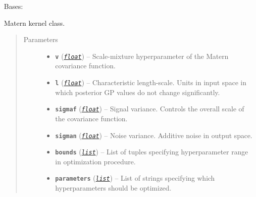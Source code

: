 \documentclass[letterpaper,10pt,english]{sphinxmanual}
\begin{document}
\begin{fulllineitems}
\label{pyGPGO.covfunc:pyGPGO.covfunc.matern}
Bases: \href{https://docs.python.org/2/library/functions.html\#object}{}

Matern kernel class.
\begin{quote}\begin{description}
\item[{Parameters}] \leavevmode\begin{itemize}
\item {} 
\textbf{\texttt{v}} (\href{https://docs.python.org/2/library/functions.html\#float}{\emph{\texttt{float}}}) -- Scale-mixture hyperparameter of the Matern covariance function.

\item {} 
\textbf{\texttt{l}} (\href{https://docs.python.org/2/library/functions.html\#float}{\emph{\texttt{float}}}) -- Characteristic length-scale. Units in input space in which posterior GP values do not
change significantly.

\item {} 
\textbf{\texttt{sigmaf}} (\href{https://docs.python.org/2/library/functions.html\#float}{\emph{\texttt{float}}}) -- Signal variance. Controls the overall scale of the covariance function.

\item {} 
\textbf{\texttt{sigman}} (\href{https://docs.python.org/2/library/functions.html\#float}{\emph{\texttt{float}}}) -- Noise variance. Additive noise in output space.

\item {} 
\textbf{\texttt{bounds}} (\href{https://docs.python.org/2/library/functions.html\#list}{\emph{\texttt{list}}}) -- List of tuples specifying hyperparameter range in optimization procedure.

\item {} 
\textbf{\texttt{parameters}} (\href{https://docs.python.org/2/library/functions.html\#list}{\emph{\texttt{list}}}) -- List of strings specifying which hyperparameters should be optimized.

\end{itemize}

\end{description}\end{quote}


\end{fulllineitems}
\end{document}
